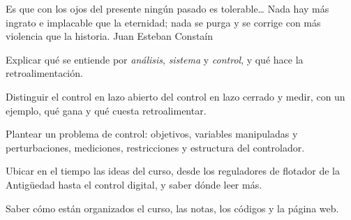 
  {Es que con los ojos del presente ningún pasado es tolerable\ldots{} Nada hay más ingrato e implacable que la eternidad; nada se purga y se corrige con más violencia que la historia.}
  {Juan Esteban Constaín}

\begin{objetivos}
  \item Explicar qué se entiende por \emph{análisis}, \emph{sistema} y \emph{control}, y qué hace la retroalimentación.
  \item Distinguir el control en lazo abierto del control en lazo cerrado y medir, con un ejemplo, qué gana y qué cuesta retroalimentar.
  \item Plantear un problema de control: objetivos, variables manipuladas y perturbaciones, mediciones, restricciones y estructura del controlador.
  \item Ubicar en el tiempo las ideas del curso, desde los reguladores de flotador de la Antigüedad hasta el control digital, y saber dónde leer más.
  \item Saber cómo están organizados el curso, las notas, los códigos y la página web.
\end{objetivos}








